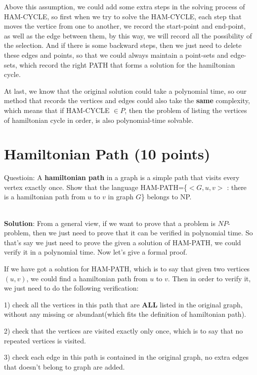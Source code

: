 \documentclass{article}
\begin{document}
Above this assumption, we could add some extra steps in the solving process of HAM-CYCLE, so first when we try to solve the HAM-CYCLE, each step that moves the vertice from one to another, we record the start-point and end-point, as well as the edge between them, by this way, we will record all the possibility of the selection. And if there is some backward steps, then we just need to delete these edges and points, so that we could always maintain a point-sets and edge-sets, which record the right PATH that forms a solution for the hamiltonian cycle.

At last, we know that the original solution could take a polynomial time, so our method that records the vertices and edges could also take the \textbf{same} complexity, which means that if HAM-CYCLE $\in{P}$, then the problem of listing the vertices of hamiltonian cycle in order, is also polynomial-time solvable.


\section{Hamiltonian Path (10 points)}
Questioin: A \textbf{hamiltonian path} in a graph is a simple path that visits every vertex exactly once. Show that the language HAM-PATH=\{$<G,u,v>$ : there is a hamiltonian path from $u$ to $v$ in graph $G$\} belongs to NP.

~\\
\textbf{Solution}:\newline
\indent From a general view, if we want to prove that a problem is $NP$-problem, then we just need to prove that it can be verified in polynomial time. So that's say we just need to prove the given a solution of HAM-PATH, we could verify it in a polynomial time. Now let's give a formal proof.

If we have got a solution for HAM-PATH, which is to say that given two vertices $(u, v)$, we could find a hamiltonian path from $u$ to $v$. Then in order to verify it, we just need to do the following verification:

1) check all the vertices in this path that are \textbf{ALL} listed in the original graph, without any missing or abundant(which fits the definition of hamiltonian path).

2) check that the vertices are visited exactly only once, which is to say that no repeated vertices is visited.

3) check each edge in this path is contained in the original graph, no extra edges that doesn't belong to graph are added. 
\end{document}
